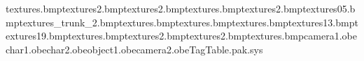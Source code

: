 textures\wantedsmall.bmp textures\bodytoes2.bmp textures\earslined2.bmp textures\eyetex.bmp textures\eyetex2.bmp textures\grass05.bmp textures\jungtree_trunk_2.bmp textures\mouthhole.bmp textures\muzzlestubble.bmp textures\noseshine.bmp textures\purprok13.bmp textures\purprok19.bmp textures\ramps.bmp textures\safhat2.bmp textures\tongueline2.bmp textures\bodyeyebrow.bmp camera1.obe char1.obe char2.obe object1.obe camera2.obe TagTable.pak.sys 